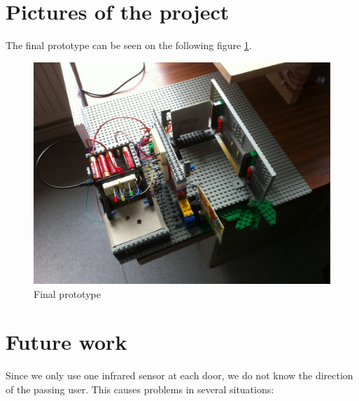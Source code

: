 \section{Pictures of the project}
The final prototype can be seen on the following figure \ref{finalPrototype}.
\begin{figure}[!h]
	\includegraphics[scale=0.18]{photo1}
    \caption{Final prototype}
    \label{finalPrototype}
\end{figure}

\section{Future work}


Since we only use one infrared sensor at each door, we do not know the direction of the passing user. This causes problems in several situations:

